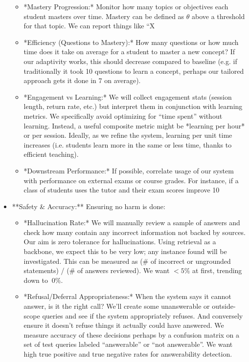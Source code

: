 \documentclass[11pt]{article}
\begin{document}
\begin{itemize}
\begin{itemize}
      \item *Mastery Progression:* Monitor how many topics or objectives each student masters over time. Mastery can be defined as $\theta$ above a threshold for that topic. We can report things like “X%
      \item *Efficiency (Questions to Mastery):* How many questions or how much time does it take on average for a student to master a new concept? If our adaptivity works, this should decrease compared to baseline (e.g. if traditionally it took 10 questions to learn a concept, perhaps our tailored approach gets it done in 7 on average).
      \item *Engagement vs Learning:* We will collect engagement stats (session length, return rate, etc.) but interpret them in conjunction with learning metrics. We specifically avoid optimizing for “time spent” without learning. Instead, a useful composite metric might be *learning per hour* or per session. Ideally, as we refine the system, learning per unit time increases (i.e. students learn more in the same or less time, thanks to efficient teaching).
      \item *Downstream Performance:* If possible, correlate usage of our system with performance on external exams or course grades. For instance, if a class of students uses the tutor and their exam scores improve 10%
    \end{itemize}
  \item **Safety \& Accuracy:** Ensuring no harm is done:
    \begin{itemize}
      \item *Hallucination Rate:* We will manually review a sample of answers and check how many contain any incorrect information not backed by sources. Our aim is zero tolerance for hallucinations. Using retrieval as a backbone, we expect this to be very low; any instance found will be investigated. This can be measured as (# of incorrect or ungrounded statements) / (# of answers reviewed). We want $< 5\%$ at first, trending down to $~0\%$.
      \item *Refusal/Deferral Appropriateness:* When the system says it cannot answer, is it the right call? We’ll create some unanswerable or outside-scope queries and see if the system appropriately refuses. And conversely ensure it doesn’t refuse things it actually could have answered. We measure accuracy of these decisions perhaps by a confusion matrix on a set of test queries labeled “answerable” or “not answerable”. We want high true positive and true negative rates for answerability detection.

\end{itemize}
\end{itemize}
\end{document}
